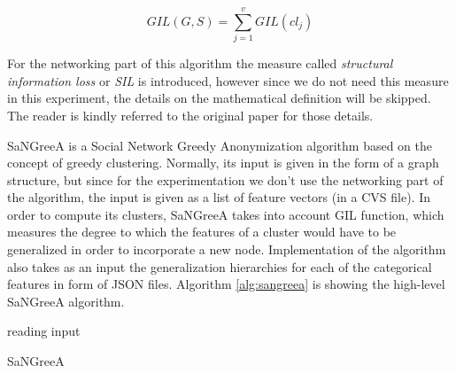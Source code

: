 \documentclass{article}
\begin{document}
\begin{equation*}
	GIL(G,S)=\sum_{j=1}^{v}GIL(cl_j)
\end{equation*}

For the networking part of this algorithm the measure called \textit{structural information loss} or \textit{SIL} is introduced, however since we do not need this measure in this experiment, the details on the mathematical definition will be skipped. The reader is kindly referred to the original paper \cite{campan2009data} for those details.

SaNGreeA is a Social Network Greedy Anonymization algorithm based on the concept of greedy clustering. Normally, its input is given in the form of a graph structure, but since for the experimentation we don't use the networking part of the algorithm, the input is given as a list of feature vectors (in a CVS file). In order to compute its clusters, SaNGreeA takes into account GIL function, which measures the degree to which the features of a cluster would have to be generalized in order to incorporate a new node. Implementation of the algorithm also takes as an input the generalization hierarchies for each of the categorical features in form of JSON files. Algorithm \vref{alg:sangreea} is showing the high-level SaNGreeA algorithm.
\\

\begin{algorithm}[H]
	reading input\;
	\caption{SaNGreeA}\label{alg:sangreea}
 	
\end{algorithm}
\end{document}
